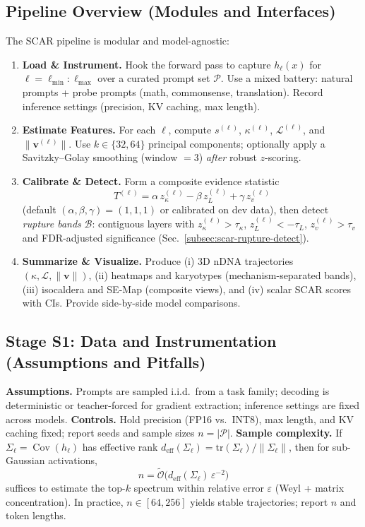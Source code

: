 \documentclass[11pt]{article}
\begin{document}
\subsection{Pipeline Overview (Modules and Interfaces)}
The SCAR pipeline is modular and model-agnostic:

\begin{enumerate}[leftmargin=1.7em,label=\textbf{S\arabic*}]
\item \textbf{Load \& Instrument.} Hook the forward pass to capture $h_\ell(x)$ for $\ell=\ell_{\min}:\ell_{\max}$ over a curated prompt set $\mathcal{P}$. Use a mixed battery: natural prompts + probe prompts (math, commonsense, translation). Record inference settings (precision, KV caching, max length).

\item \textbf{Estimate Features.} For each $\ell$, compute $s^{(\ell)}$, $\kappa^{(\ell)}$, $\mathcal{L}^{(\ell)}$, and $\|\mathbf{v}^{(\ell)}\|$. Use $k\in\{32,64\}$ principal components; optionally apply a Savitzky–Golay smoothing (window $=3$) \emph{after} robust $z$-scoring.

\item \textbf{Calibrate \& Detect.} Form a composite evidence statistic
\[
T^{(\ell)}=\alpha\,z_\kappa^{(\ell)}-\beta\,z_L^{(\ell)}+\gamma\,z_v^{(\ell)}
\]
(default $(\alpha,\beta,\gamma)=(1,1,1)$ or calibrated on dev data), then detect \emph{rupture bands} $\mathcal{B}$: contiguous layers with $z_\kappa^{(\ell)}>\tau_\kappa$, $z_L^{(\ell)}<-\tau_L$, $z_v^{(\ell)}>\tau_v$ and FDR-adjusted significance (Sec.~\ref{subsec:scar-rupture-detect}).

\item \textbf{Summarize \& Visualize.} Produce (i) 3D nDNA trajectories $(\kappa,\mathcal{L},\|\mathbf{v}\|)$, (ii) heatmaps and karyotypes (mechanism-separated bands), (iii) isocaldera and SE-Map (composite views), and (iv) scalar \textsc{SCAR} scores with CIs. Provide side-by-side model comparisons.
\end{enumerate}

\subsection{Stage S1: Data and Instrumentation (Assumptions and Pitfalls)}
\label{subsec:scar-data}
\textbf{Assumptions.} Prompts are sampled i.i.d.\ from a task family; decoding is deterministic or teacher-forced for gradient extraction; inference settings are fixed across models.  
\textbf{Controls.} Hold precision (FP16 vs.\ INT8), max length, and KV caching fixed; report seeds and sample sizes $n=|\mathcal{P}|$.  
\textbf{Sample complexity.} If $\Sigma_\ell=\operatorname{Cov}(h_\ell)$ has effective rank $d_{\mathrm{eff}}(\Sigma_\ell)=\mathrm{tr}(\Sigma_\ell)/\|\Sigma_\ell\|$, then for sub-Gaussian activations,
\[
n=\tilde{\mathcal{O}}\!\big(d_{\mathrm{eff}}(\Sigma_\ell)\,\varepsilon^{-2}\big)
\]
suffices to estimate the top-$k$ spectrum within relative error $\varepsilon$ (Weyl + matrix concentration). In practice, $n\!\in\![64,256]$ yields stable trajectories; report $n$ and token lengths.
\end{document}
